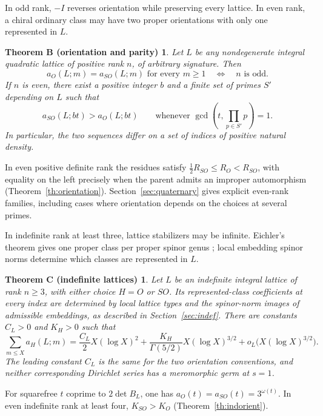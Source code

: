 \documentclass[11pt]{article}
\newtheorem*{mainthmB}{Theorem B (orientation and parity)}
\newtheorem*{mainthmC}{Theorem C (indefinite lattices)}
\theoremstyle{remark}\newtheorem{remark}[theorem]{Remark}
\begin{document}
In odd rank, $-I$ reverses orientation while preserving every lattice.
In even rank, a chiral ordinary class may have two proper orientations
with only one represented in $L$.

\begin{mainthmB}
Let $L$ be any nondegenerate integral quadratic lattice of positive rank
$n$, of arbitrary signature. Then
\[
 a_O(L;m)=a_{SO}(L;m)\text{ for every }m\ge1
 \quad\Longleftrightarrow\quad n\text{ is odd}.
\]
If $n$ is even, there exist a positive integer $b$ and a finite set of
primes $S'$ depending on $L$ such that
\[
 a_{SO}(L;bt)>a_O(L;bt)
 \qquad\text{whenever }\gcd\!\left(t,\prod_{p\in S'}p\right)=1.
\]
In particular, the two sequences differ on a set of indices of positive
natural density.
\end{mainthmB}

In even positive definite rank the residues satisfy
$\tfrac12R_{SO}\le R_O<R_{SO}$, with equality on the left precisely when
the parent admits an improper automorphism
(Theorem~\ref{th:orientation}). Section~\ref{sec:quaternary} gives
explicit even-rank families, including cases where orientation depends
on the choices at several primes.

In indefinite rank at least three, lattice stabilizers may be
infinite. Eichler's theorem gives one proper class per proper spinor
genus \cite[\S9.2]{SP}; local embedding spinor norms determine which
classes are represented in $L$.

\begin{mainthmC}
Let $L$ be an indefinite integral lattice of rank $n\ge3$, with either
choice $H=O$ or $SO$. Its represented-class coefficients at every index
are determined by local lattice types and the spinor-norm images of
admissible embeddings, as described in Section~\ref{sec:indef}. There are
constants $C_L>0$ and $K_H>0$ such that
\begin{equation}\label{eq:introindefinite}
 \sum_{m\le X}a_H(L;m)
 =\frac{C_L}{2}X(\log X)^2
 +\frac{K_H}{\Gamma(5/2)}X(\log X)^{3/2}
 +o_L\bigl(X(\log X)^{3/2}\bigr).
\end{equation}
The leading constant $C_L$ is the same for the two orientation
conventions, and neither corresponding Dirichlet series has a meromorphic
germ at $s=1$.
\end{mainthmC}

For squarefree $t$ coprime to $2\det B_L$, one has
$a_O(t)=a_{SO}(t)=3^{\omega(t)}$. In even indefinite rank at least four,
$K_{SO}>K_O$ (Theorem~\ref{th:indorient}).
\end{document}
